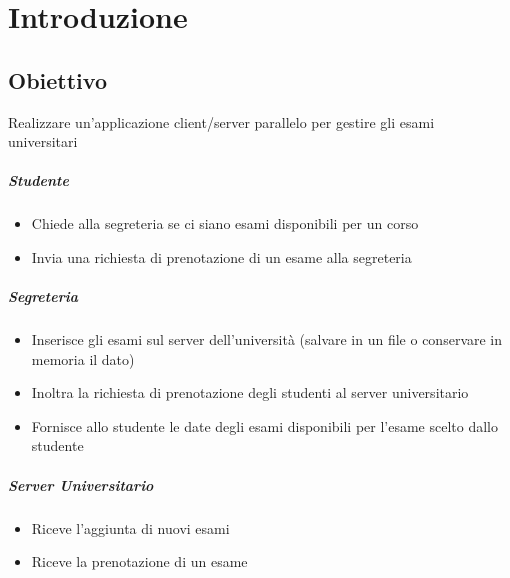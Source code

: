 \thispagestyle{headings}
\chapter{Introduzione}
\label{key}
\section{Obiettivo}
Realizzare un'applicazione client/server parallelo per gestire gli esami \\universitari

\paragraph{Studente}
\begin{itemize}
	\item Chiede alla segreteria se ci siano esami disponibili per un corso
	\item Invia una richiesta di prenotazione di un esame alla segreteria
\end{itemize}


\paragraph{Segreteria}
\begin{itemize}
	\item Inserisce gli esami sul server dell'università (salvare in un file o conservare in
	memoria il dato)
	\item Inoltra la richiesta di prenotazione degli studenti al server universitario
	\item Fornisce allo studente le date degli esami disponibili per l'esame scelto dallo
	studente
\end{itemize}

\paragraph{Server Universitario}
\begin{itemize}
	\item Riceve l'aggiunta di nuovi esami
	\item Riceve la prenotazione di un esame
\end{itemize}




\thispagestyle{headings} %
